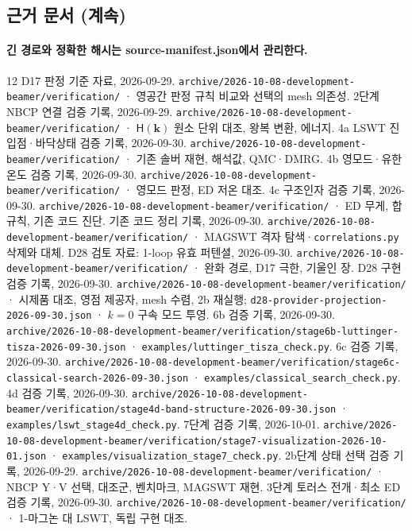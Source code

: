 \subsection{근거 문서 (계속)}\label{sources-continued}
\begingroup%
  \framesubtitle{긴 경로와 정확한 해시는 source-manifest.json에서 관리한다.}
  \small
  \begin{thebibliography}{12}
    \setcounter{enumiv}{10}
      D17 판정 기준 자료, 2026-09-29.
      \newblock \texttt{archive/2026-10-08-development-beamer/verification/} · 영공간 판정 규칙 비교와 선택의 mesh 의존성.
      2단계 NBCP 연결 검증 기록, 2026-09-29.
      \newblock \texttt{archive/2026-10-08-development-beamer/verification/} · $\mathsf H(\mathbf k)$ 원소 단위 대조, 왕복 변환, 에너지.
      4a LSWT 진입점·바닥상태 검증 기록, 2026-09-30.
      \newblock \texttt{archive/2026-10-08-development-beamer/verification/} · 기존 솔버 재현, 해석값, QMC·DMRG.
      4b 영모드·유한 온도 검증 기록, 2026-09-30.
      \newblock \texttt{archive/2026-10-08-development-beamer/verification/} · 영모드 판정, ED 저온 대조.
      4c 구조인자 검증 기록, 2026-09-30.
      \newblock \texttt{archive/2026-10-08-development-beamer/verification/} · ED 무게, 합 규칙, 기존 코드 진단.
      기존 코드 정리 기록, 2026-09-30.
      \newblock \texttt{archive/2026-10-08-development-beamer/verification/} · MAGSWT 격자 탐색·\texttt{correlations.py} 삭제와 대체.
      D28 검토 자료: 1-loop 유효 퍼텐셜, 2026-09-30.
      \newblock \texttt{archive/2026-10-08-development-beamer/verification/} · 완화 경로, D17 극한, 기울인 장.
      D28 구현 검증 기록, 2026-09-30.
      \newblock \texttt{archive/2026-10-08-development-beamer/verification/} · 시제품 대조, 영점 제공자, mesh 수렴, 2b 재실행; \texttt{d28-provider-projection-2026-09-30.json} · $k=0$ 구속 모드 투영.
      6b 검증 기록, 2026-09-30.
      \newblock \texttt{archive/2026-10-08-development-beamer/verification/stage6b-luttinger-tisza-2026-09-30.json} · \texttt{examples/luttinger\_tisza\_check.py}.
      6c 검증 기록, 2026-09-30.
      \newblock \texttt{archive/2026-10-08-development-beamer/verification/stage6c-classical-search-2026-09-30.json} · \texttt{examples/classical\_search\_check.py}.
      4d 검증 기록, 2026-09-30.
      \newblock \texttt{archive/2026-10-08-development-beamer/verification/stage4d-band-structure-2026-09-30.json} · \texttt{examples/lswt\_stage4d\_check.py}.
      7단계 검증 기록, 2026-10-01.
      \newblock \texttt{archive/2026-10-08-development-beamer/verification/stage7-visualization-2026-10-01.json} · \texttt{examples/visualization\_stage7\_check.py}.
      2b단계 상태 선택 검증 기록, 2026-09-29.
      \newblock \texttt{archive/2026-10-08-development-beamer/verification/} · NBCP Y·V 선택, 대조군, 벤치마크, MAGSWT 재현.
      3단계 토러스 전개·최소 ED 검증 기록, 2026-09-30.
      \newblock \texttt{archive/2026-10-08-development-beamer/verification/} · 1-마그논 대 LSWT, 독립 구현 대조.
  \end{thebibliography}
\endgroup


